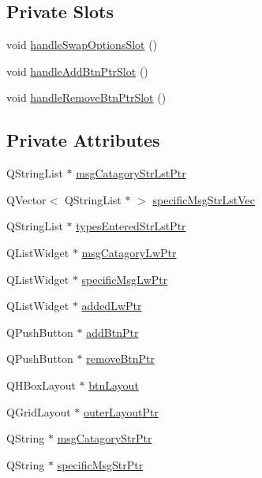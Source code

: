 \subsection*{Private Slots}
\begin{DoxyCompactItemize}
\item 
void \hyperlink{class_new_file_page__3_a277967fa1a15b25f3c8184b3d971ff53}{handle\-Swap\-Options\-Slot} ()
\item 
void \hyperlink{class_new_file_page__3_a348d6b668e4102484aa3f9a27d2d94b5}{handle\-Add\-Btn\-Ptr\-Slot} ()
\item 
void \hyperlink{class_new_file_page__3_a3f4507fc379a74674ce915df5c7e8632}{handle\-Remove\-Btn\-Ptr\-Slot} ()
\end{DoxyCompactItemize}
\subsection*{Private Attributes}
\begin{DoxyCompactItemize}
\item 
Q\-String\-List $\ast$ \hyperlink{class_new_file_page__3_a77486a3682ab46459e11b679db6fb9b2}{msg\-Catagory\-Str\-Lst\-Ptr}
\item 
Q\-Vector$<$ Q\-String\-List $\ast$ $>$ \hyperlink{class_new_file_page__3_a6d8b5daf0fff54a17b1a2acb1a4fbd0b}{specific\-Msg\-Str\-Lst\-Vec}
\item 
Q\-String\-List $\ast$ \hyperlink{class_new_file_page__3_a05999dab4720785be239dc2fa46d9f69}{types\-Entered\-Str\-Lst\-Ptr}
\item 
Q\-List\-Widget $\ast$ \hyperlink{class_new_file_page__3_ae9367af4aff708fc95ed9c4a17367523}{msg\-Catagory\-Lw\-Ptr}
\item 
Q\-List\-Widget $\ast$ \hyperlink{class_new_file_page__3_a1cf3ff30d6f22ed78cd9215c0f21697c}{specific\-Msg\-Lw\-Ptr}
\item 
Q\-List\-Widget $\ast$ \hyperlink{class_new_file_page__3_a5e3ba4d0dd73ecc3c5a37f4bd2420e04}{added\-Lw\-Ptr}
\item 
Q\-Push\-Button $\ast$ \hyperlink{class_new_file_page__3_ab08b4cb0255ee702eba9e6b1b160ec8d}{add\-Btn\-Ptr}
\item 
Q\-Push\-Button $\ast$ \hyperlink{class_new_file_page__3_a10240665337c2c34d2d9e5c05602e800}{remove\-Btn\-Ptr}
\item 
Q\-H\-Box\-Layout $\ast$ \hyperlink{class_new_file_page__3_a5688f5927a3dc316a929bfe63cf78d1f}{btn\-Layout}
\item 
Q\-Grid\-Layout $\ast$ \hyperlink{class_new_file_page__3_a3cfae6c3a60d34d9e1f481046e5b4a45}{outer\-Layout\-Ptr}
\item 
Q\-String $\ast$ \hyperlink{class_new_file_page__3_a96edaebd6c24a640a001464ae9b339d3}{msg\-Catagory\-Str\-Ptr}
\item 
Q\-String $\ast$ \hyperlink{class_new_file_page__3_aabe7247bb4d562591c46d245c1d71ad0}{specific\-Msg\-Str\-Ptr}
\end{DoxyCompactItemize}


